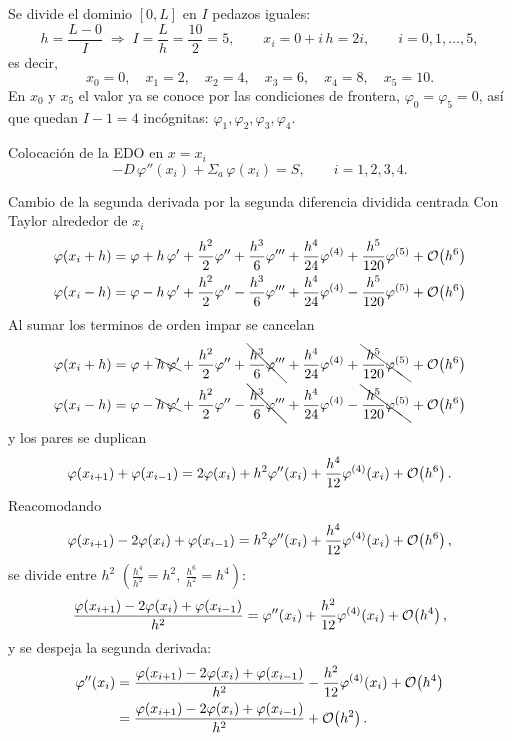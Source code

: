 
Se divide el dominio $[0, L]$ en $I$ pedazos iguales:
\[
h = \frac{L - 0}{I} \;\Longrightarrow\; I = \frac{L}{h} = \frac{10}{2} = 5,
\qquad x_i = 0 + i\,h = 2i, \qquad i = 0, 1, \dots, 5,
\]
es decir,
\[
x_0 = 0, \quad x_1 = 2, \quad x_2 = 4, \quad x_3 = 6, \quad x_4 = 8, \quad x_5 = 10 .
\]
En $x_0$ y $x_5$ el valor ya se conoce por las condiciones de frontera, $\varphi_0 = \varphi_5 = 0$,
así que quedan $I - 1 = 4$ incógnitas: $\varphi_1, \varphi_2, \varphi_3, \varphi_4$.

Colocación de la EDO en $x = x_i$
\[
-D\,\varphi''(x_i) + \Sigma_a\,\varphi(x_i) = S, \qquad i = 1, 2, 3, 4 .
\]

Cambio de la segunda derivada por la segunda diferencia dividida centrada
Con Taylor alrededor de $x_i$ 
\begin{align*}
	\varphi(x_i + h) &= \varphi + h\,\varphi' + \frac{h^2}{2}\varphi'' + \frac{h^3}{6}\varphi'''
	+ \frac{h^4}{24}\varphi^{(4)} + \frac{h^5}{120}\varphi^{(5)} + \mathcal{O}\!\left(h^6\right)\\
	\varphi(x_i - h) &= \varphi - h\,\varphi' + \frac{h^2}{2}\varphi'' - \frac{h^3}{6}\varphi'''
	+ \frac{h^4}{24}\varphi^{(4)} - \frac{h^5}{120}\varphi^{(5)} + \mathcal{O}\!\left(h^6\right)
\end{align*}
Al sumar los terminos de orden impar se cancelan
\begin{align*}
	\varphi(x_i + h) &= \varphi + \bcancel{h\,\varphi'} + \frac{h^2}{2}\varphi''
	+ \bcancel{\frac{h^3}{6}\varphi'''} + \frac{h^4}{24}\varphi^{(4)}
	+ \bcancel{\frac{h^5}{120}\varphi^{(5)}} + \mathcal{O}\!\left(h^6\right)\\
	\varphi(x_i - h) &= \varphi - \bcancel{h\,\varphi'} + \frac{h^2}{2}\varphi''
	- \bcancel{\frac{h^3}{6}\varphi'''} + \frac{h^4}{24}\varphi^{(4)}
	- \bcancel{\frac{h^5}{120}\varphi^{(5)}} + \mathcal{O}\!\left(h^6\right)
\end{align*}
y los pares se duplican
\[
\varphi(x_{i+1}) + \varphi(x_{i-1})
= 2\varphi(x_i) + h^2\varphi''(x_i) + \frac{h^4}{12}\varphi^{(4)}(x_i) + \mathcal{O}\!\left(h^6\right).
\]
Reacomodando
\[
\varphi(x_{i+1}) - 2\varphi(x_i) + \varphi(x_{i-1})
= h^2\varphi''(x_i) + \frac{h^4}{12}\varphi^{(4)}(x_i) + \mathcal{O}\!\left(h^6\right),
\]
se divide entre $h^2$ $\left(\frac{h^4}{h^2} = h^2,\ \frac{h^6}{h^2} = h^4\right)$:
\[
\frac{\varphi(x_{i+1}) - 2\varphi(x_i) + \varphi(x_{i-1})}{h^2}
= \varphi''(x_i) + \frac{h^2}{12}\varphi^{(4)}(x_i) + \mathcal{O}\!\left(h^4\right),
\]
y se despeja la segunda derivada:
\begin{align*}
	\varphi''(x_i)
	&= \frac{\varphi(x_{i+1}) - 2\varphi(x_i) + \varphi(x_{i-1})}{h^2} - \frac{h^2}{12}\varphi^{(4)}(x_i) + \mathcal{O}\!\left(h^4\right)\\
	&= \frac{\varphi(x_{i+1}) - 2\varphi(x_i) + \varphi(x_{i-1})}{h^2} + \mathcal{O}\!\left(h^2\right).
\end{align*}

